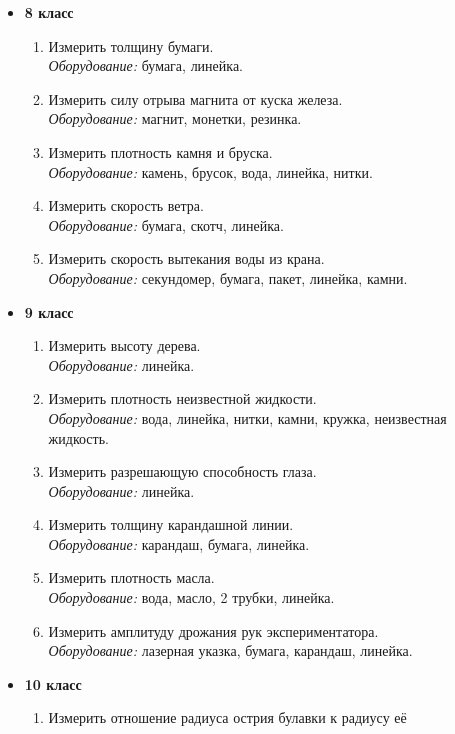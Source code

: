 \documentclass[12pt,a4paper,oneside,draft]{scrartcl}
\begin{document}
\begin{itemize}
\item \textbf{8 класс}
  \begin{enumerate}
  \item Измерить толщину бумаги.\\
    \textit{Оборудование:} бумага, линейка.
  \item Измерить силу отрыва магнита от куска железа. \\
    \textit{Оборудование:} магнит, монетки, резинка.
  \item Измерить плотность камня и бруска.\\
    \textit{Оборудование:} камень, брусок, вода, линейка, нитки.
  \item Измерить скорость ветра.\\
    \textit{Оборудование:} бумага, скотч, линейка.
  \item Измерить скорость вытекания воды из крана.\\
    \textit{Оборудование:} секундомер, бумага, пакет, линейка, камни.
  \end{enumerate}
\item \textbf{9 класс}
  \begin{enumerate}
  \item Измерить высоту дерева. \\
    \textit{Оборудование:} линейка.
  \item Измерить плотность неизвестной жидкости.\\
    \textit{Оборудование:} вода, линейка, нитки, камни, кружка,
    неизвестная жидкость.
  \item Измерить разрешающую способность глаза. \\
    \textit{Оборудование:} линейка.
  \item Измерить толщину карандашной линии. \\
    \textit{Оборудование:} карандаш, бумага, линейка.
  \item Измерить плотность масла. \\
    \textit{Оборудование:} вода, масло, 2 трубки, линейка.
  \item Измерить амплитуду дрожания рук экспериментатора. \\
    \textit{Оборудование:} лазерная указка, бумага, карандаш, линейка.
  \end{enumerate}
\item \textbf{10 класс}
  \begin{enumerate}
  \item Измерить отношение радиуса острия булавки к радиусу её

\end{enumerate}
\end{itemize}
\end{document}
